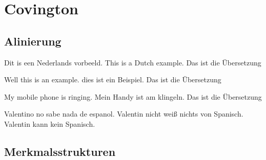 \section{Covington}

\subsection{Alinierung}


\gll Dit is een  Nederlands vorbeeld.
This is a Dutch example.
\glt Das ist die Übersetzung
\glend


\gll Well this is an example.
{} dies ist ein Beispiel.
\glt Das ist die Übersetzung
\glend


\gll My {mobile phone} {is ringing.}
Mein Handy {ist am klingeln}.
\glt Das ist die Übersetzung
\glend


\gll Valentino no sabe nada de espanol.
Valentin nicht weiß nichts von Spanisch.
\glt Valentin kann kein Spanisch.
\glend

\subsection{Merkmalsstrukturen}



